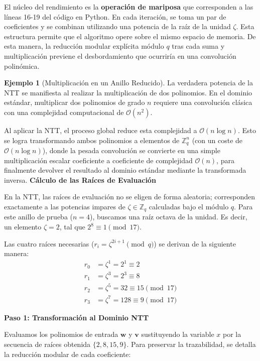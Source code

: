 \documentclass[11pt, a4paper]{report}
\theoremstyle{definition}
\newtheorem{ejemplo}{Ejemplo}[chapter]
\begin{document}
El núcleo del rendimiento es la \textbf{operación de mariposa} que corresponden a las líneas 16-19 del código en Python. En cada iteración, se toma un par de coeficientes y se combinan utilizando una potencia de la raíz de la unidad $\zeta$. Esta estructura permite que el algoritmo opere sobre el mismo espacio de memoria. De esta manera, la reducción modular explícita módulo $q$ tras cada suma y multiplicación previene el desbordamiento que ocurriría en una convolución polinómica.

\begin{ejemplo}[Multiplicación en un Anillo Reducido]
La verdadera potencia de la NTT se manifiesta al realizar la multiplicación de dos polinomios. En el dominio estándar, multiplicar dos polinomios de grado $n$ requiere una convolución clásica con una complejidad computacional de $\mathcal{O}(n^2)$. 

Al aplicar la NTT, el proceso global reduce esta complejidad a $\mathcal{O}(n \log n)$. Esto se logra transformando ambos polinomios a elementos de $\mathbb{Z}_q^n$ (con un coste de $\mathcal{O}(n \log n)$), donde la pesada convolución se convierte en una simple multiplicación escalar coeficiente a coeficiente de complejidad $\mathcal{O}(n)$, para finalmente devolver el resultado al dominio estándar mediante la transformada inversa.
\vspace{0.3cm}
\textbf{Cálculo de las Raíces de Evaluación}

En la NTT, las raíces de evaluación no se eligen de forma aleatoria; corresponden exactamente a las potencias impares de $\zeta \in \mathbb{Z}_q$ calculadas bajo el módulo $q$. Para este anillo de prueba ($n=4$), buscamos una raíz octava de la unidad. Es decir, un elemento $\zeta = 2$, tal que $2^8 \equiv 1 \pmod{17}$. 

Las cuatro raíces necesarias ($r_i = \zeta^{2i+1} \pmod q$) se derivan de la siguiente manera:
\begin{align*}
    r_0 &= \zeta^1 = 2^1 \equiv 2 \\
    r_1 &= \zeta^3 = 2^3 \equiv 8 \\
    r_2 &= \zeta^5 = 32  \equiv 15 \pmod{17} \\
    r_3 &= \zeta^7 = 128 \equiv 9 \pmod{17}
\end{align*}

\textbf{Paso 1: Transformación al Dominio NTT}

Evaluamos los polinomios de entrada $\mathbf{w}$ y $\mathbf{v}$ sustituyendo la variable $x$ por la secuencia de raíces obtenida $\{2, 8, 15, 9\}$. Para preservar la trazabilidad, se detalla la reducción modular de cada coeficiente:


\end{ejemplo}
\end{document}
